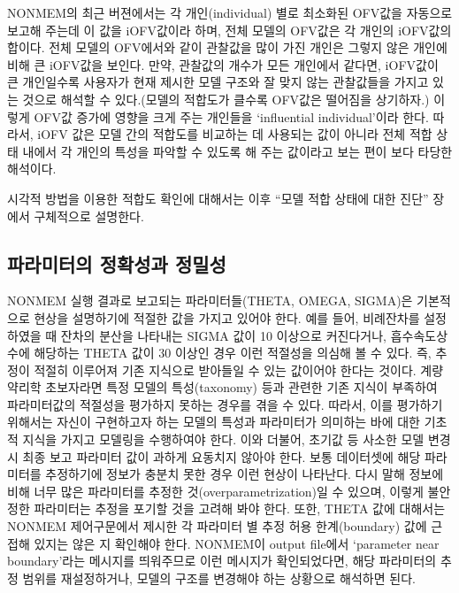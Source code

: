 \documentclass[
  10pt,
  krantz2,
  a4paper]{krantz}
\theoremstyle{definition}
\theoremstyle{definition}
\theoremstyle{definition}
\theoremstyle{remark}
\begin{document}
NONMEM의 최근 버젼에서는 각 개인(individual) 별로 최소화된 OFV값을 자동으로 보고해 주는데 이 값을 iOFV값이라 하며, 전체 모델의 OFV값은 각 개인의 iOFV값의 합이다. 전체 모델의 OFV에서와 같이 관찰값을 많이 가진 개인은 그렇지 않은 개인에 비해 큰 iOFV값을 보인다. 만약, 관찰값의 개수가 모든 개인에서 같다면, iOFV값이 큰 개인일수록 사용자가 현재 제시한 모델 구조와 잘 맞지 않는 관찰값들을 가지고 있는 것으로 해석할 수 있다.(모델의 적합도가 클수록 OFV값은 떨어짐을 상기하자.) 이렇게 OFV값 증가에 영향을 크게 주는 개인들을 `influential individual'이라 한다. 따라서, iOFV 값은 모델 간의 적합도를 비교하는 데 사용되는 값이 아니라 전체 적합 상태 내에서 각 개인의 특성을 파악할 수 있도록 해 주는 값이라고 보는 편이 보다 타당한 해석이다.

시각적 방법을 이용한 적합도 확인에 대해서는 이후 ``모델 적합 상태에 대한 진단'' 장에서 구체적으로 설명한다.

\hypertarget{uxd30cuxb77cuxbbf8uxd130uxc758-uxc815uxd655uxc131uxacfc-uxc815uxbc00uxc131}{%
\subsection{파라미터의 정확성과 정밀성}\label{uxd30cuxb77cuxbbf8uxd130uxc758-uxc815uxd655uxc131uxacfc-uxc815uxbc00uxc131}}

NONMEM 실행 결과로 보고되는 파라미터들(THETA, OMEGA, SIGMA)은 기본적으로 현상을 설명하기에 적절한 값을 가지고 있어야 한다. 예를 들어, 비례잔차를 설정하였을 때 잔차의 분산을 나타내는 SIGMA 값이 10 이상으로 커진다거나, 흡수속도상수에 해당하는 THETA 값이 30 이상인 경우 이런 적절성을 의심해 볼 수 있다. 즉, 추정이 적절히 이루어져 기존 지식으로 받아들일 수 있는 값이어야 한다는 것이다. 계량약리학 초보자라면 특정 모델의 특성(taxonomy) 등과 관련한 기존 지식이 부족하여 파라미터값의 적절성을 평가하지 못하는 경우를 겪을 수 있다. 따라서, 이를 평가하기 위해서는 자신이 구현하고자 하는 모델의 특성과 파라미터가 의미하는 바에 대한 기초적 지식을 가지고 모델링을 수행하여야 한다. 이와 더불어, 초기값 등 사소한 모델 변경 시 최종 보고 파라미터 값이 과하게 요동치지 않아야 한다. 보통 데이터셋에 해당 파라미터를 추정하기에 정보가 충분치 못한 경우 이런 현상이 나타난다. 다시 말해 정보에 비해 너무 많은 파라미터를 추정한 것(overparametrization)일 수 있으며, 이렇게 불안정한 파라미터는 추정을 포기할 것을 고려해 봐야 한다. 또한, THETA 값에 대해서는 NONMEM 제어구문에서 제시한 각 파라미터 별 추정 허용 한계(boundary) 값에 근접해 있지는 않은 지 확인해야 한다. NONMEM이 output file에서 `parameter near boundary'라는 메시지를 띄워주므로 이런 메시지가 확인되었다면, 해당 파라미터의 추정 범위를 재설정하거나, 모델의 구조를 변경해야 하는 상황으로 해석하면 된다.
\end{document}
